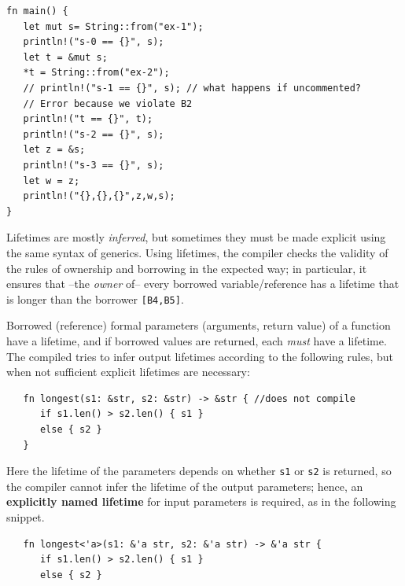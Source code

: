 \begin{lstlisting}
fn main() {
   let mut s= String::from("ex-1");
   println!("s-0 == {}", s);
   let t = &mut s;
   *t = String::from("ex-2");
   // println!("s-1 == {}", s); // what happens if uncommented?
   // Error because we violate B2
   println!("t == {}", t);
   println!("s-2 == {}", s);
   let z = &s;
   println!("s-3 == {}", s);
   let w = z;
   println!("{},{},{}",z,w,s);
}
\end{lstlisting}

Lifetimes are mostly \textit{inferred},
but sometimes they must be made explicit using the same syntax of generics.
Using lifetimes, the compiler checks the validity of the
rules of ownership and borrowing in the expected way;
in particular, it ensures that {--}the \textit{owner} of{--} every
borrowed variable/reference has a lifetime that is longer
than the borrower \texttt{[B4,B5]}.
\nl

Borrowed (reference) formal parameters (arguments, return value) of a function have a
lifetime, and  
if borrowed values are returned, each \textit{must} have a lifetime.\\
The compiled tries to infer output lifetimes according to the following rules, but when not sufficient explicit lifetimes are necessary:

\begin{lstlisting}
   fn longest(s1: &str, s2: &str) -> &str { //does not compile
      if s1.len() > s2.len() { s1 }
      else { s2 }
   }
\end{lstlisting}
Here the lifetime of the parameters depends on whether \lstinline|s1| or \lstinline|s2| is returned,
so the compiler cannot infer the lifetime of the output parameters;
hence, an \textbf{explicitly named lifetime} for input parameters is required, as in the following snippet.
\begin{lstlisting}
   fn longest<'a>(s1: &'a str, s2: &'a str) -> &'a str {
      if s1.len() > s2.len() { s1 }
      else { s2 }
\end{lstlisting}
\newpage

